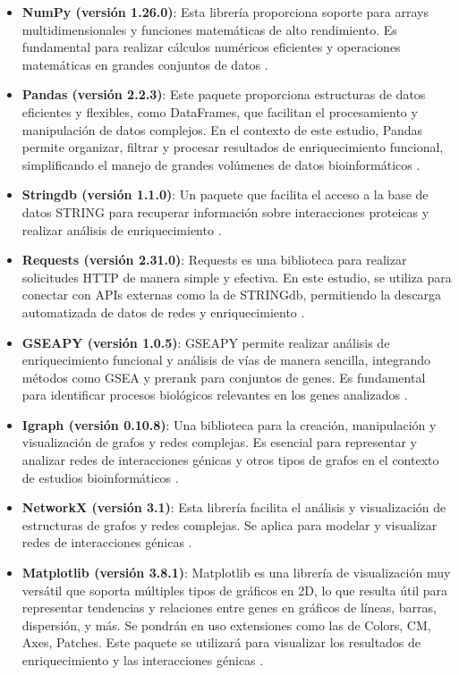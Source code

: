 \begin{itemize}
	\item \textbf{NumPy (versión 1.26.0)}: Esta librería proporciona soporte para arrays multidimensionales y funciones matemáticas de alto rendimiento. Es fundamental para realizar cálculos numéricos eficientes y operaciones matemáticas en grandes conjuntos de datos \cite{numpy}.
	\item \textbf{Pandas (versión 2.2.3)}: Este paquete proporciona estructuras de datos eficientes y flexibles, como DataFrames, que facilitan el procesamiento y manipulación de datos complejos. En el contexto de este estudio, Pandas permite organizar, filtrar y procesar resultados de enriquecimiento funcional, simplificando el manejo de grandes volúmenes de datos bioinformáticos \cite{pandas}.
	\item \textbf{Stringdb (versión 1.1.0)}: Un paquete que facilita el acceso a la base de datos STRING para recuperar información sobre interacciones proteicas y realizar análisis de enriquecimiento \cite{stringdb}.
	\item \textbf{Requests (versión 2.31.0)}: Requests es una biblioteca para realizar solicitudes HTTP de manera simple y efectiva. En este estudio, se utiliza para conectar con APIs externas como la de STRINGdb, permitiendo la descarga automatizada de datos de redes y enriquecimiento \cite{requests}.
	\item \textbf{GSEAPY (versión 1.0.5)}: GSEAPY permite realizar análisis de enriquecimiento funcional y análisis de vías de manera sencilla, integrando métodos como GSEA y prerank para conjuntos de genes. Es fundamental para identificar procesos biológicos relevantes en los genes analizados \cite{gseapy}.
	\item \textbf{Igraph (versión 0.10.8)}: Una biblioteca para la creación, manipulación y visualización de grafos y redes complejas. Es esencial para representar y analizar redes de interacciones génicas y otros tipos de grafos en el contexto de estudios bioinformáticos \cite{igraph}.
	\item \textbf{NetworkX (versión 3.1)}: Esta librería facilita el análisis y visualización de estructuras de grafos y redes complejas. Se aplica para modelar y visualizar redes de interacciones génicas \cite{networkx}.
	\item \textbf{Matplotlib (versión 3.8.1)}: Matplotlib es una librería de visualización muy versátil que soporta múltiples tipos de gráficos en 2D, lo que resulta útil para representar tendencias y relaciones entre genes en gráficos de líneas, barras, dispersión, y más. Se pondrán en uso extensiones como las de Colors, CM, Axes, Patches. Este paquete se utilizará para visualizar los resultados de enriquecimiento y las interacciones génicas \cite{matplotlib}.

\end{itemize}
